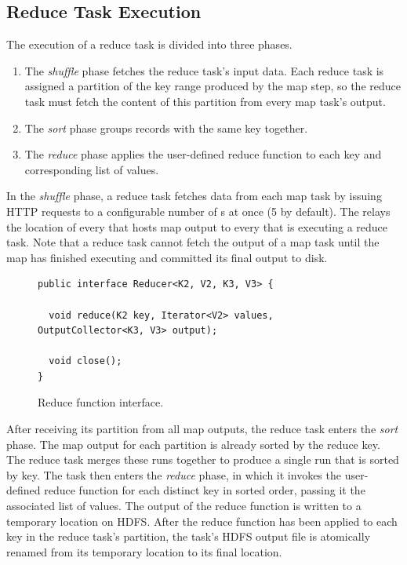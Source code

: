 \subsection{Reduce Task Execution}
\label{ch:mrback:sec:reducetask}
The execution of a reduce task is divided into three phases.
\begin{enumerate}
\item The \emph{shuffle} phase fetches the reduce task's input
  data. Each reduce task is assigned a partition of the key range
  produced by the map step, so the reduce task must fetch the content
  of this partition from every map task's output.
\item The \emph{sort} phase groups records with the same key together.
\item The \emph{reduce} phase applies the user-defined reduce function
  to each key and corresponding list of values.
\end{enumerate}

In the \emph{shuffle} phase, a reduce task fetches data from each map task by
issuing HTTP requests to a configurable number of {\TT}s at once (5 by
default). The {\JT} relays the location of every {\TT} that hosts map output to
every {\TT} that is executing a reduce task. Note that a reduce task cannot
fetch the output of a map task until the map has finished executing and
committed its final output to disk.

\begin{figure}[t]
\ssp
\begin{minipage}{\linewidth}
\begin{verbatim}
public interface Reducer<K2, V2, K3, V3> {

  void reduce(K2 key, Iterator<V2> values, OutputCollector<K3, V3> output);

  void close();
}
\end{verbatim}

\end{minipage}
\caption{Reduce function interface.}
\label{fig:reducefunction}
\end{figure}

After receiving its partition from all map outputs, the reduce task enters the
\emph{sort} phase. The map output for each partition is already sorted by the
reduce key. The reduce task merges these runs together to produce a single run
that is sorted by key. The task then enters the \emph{reduce} phase, in which it
invokes the user-defined reduce function for each distinct key in sorted order,
passing it the associated list of values. The output of the reduce function is
written to a temporary location on HDFS\@. After the reduce function has been
applied to each key in the reduce task's partition, the task's HDFS output file
is atomically renamed from its temporary location to its final location.

